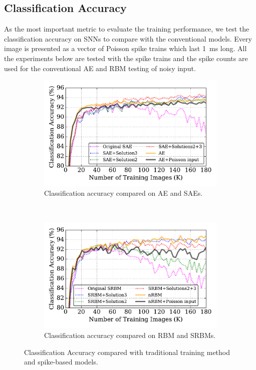 \subsection{Classification Accuracy}
As the most important metric to evaluate the training performance, we test the classification accuracy on SNNs to compare with the conventional models.
Every image is presented as a vector of Poisson spike trains which last 1~ms long.
All the experiments below are tested with the spike trains and the spike counts are used for the conventional AE and RBM testing of noisy input. 

\begin{figure}
	\centering
	\begin{subfigure}[t]{0.7\textwidth}
		\includegraphics[width=\textwidth]{pics_sdlm/43_MNIST_SAE_all/compare_result.pdf}
		\caption{Classification accuracy compared on AE and SAEs.}
	\end{subfigure}\\
	\begin{subfigure}[t]{0.7\textwidth}
		\includegraphics[width=\textwidth]{pics_sdlm/53_MNIST_SRBM_all/compare_result.pdf}
		\caption{Classification accuracy compared on RBM and SRBMs.}
	\end{subfigure}
	\caption{Classification Accuracy compared with traditional training method and spike-based models.}
\end{figure}

